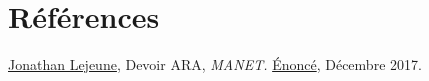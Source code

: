 \documentclass[10pt]{report}
\begin{document}
\newpage
\section*{Références}
\href{https://pages.lip6.fr/Jonathan.Lejeune/}{Jonathan Lejeune}, Devoir ARA, \textit{MANET.} \href{https://pages.lip6.fr/Jonathan.Lejeune/documents/enseignements/ARA/sujet\_devoir\_2017\_2018.pdf}{Énoncé}, Décembre 2017.\\

\newpage
%
\end{document}
